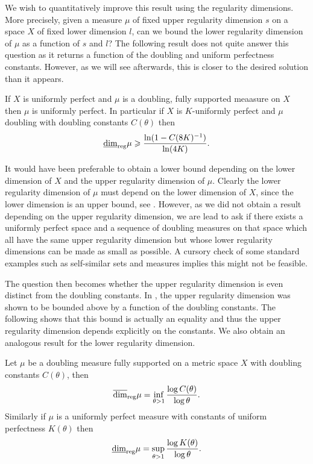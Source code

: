 We wish to quantitatively improve this result using the regularity dimensions. More precisely, given a measure $\mu$ of fixed upper regularity dimension $s$ on a space $X$ of fixed lower dimension $l$, can we bound the lower regularity dimension of $\mu$ as a function of $s$ and $l$? The following result does not quite answer this question as it returns a function of the doubling and uniform perfectness constants. However, as we will see afterwards, this is closer to the desired solution than it appears.

\begin{prop}
	If $X$ is uniformly perfect and $\mu$ is a doubling, fully supported meaasure on $X$ then $\mu$ is uniformly perfect. In particular if $X$ is $K$-uniformly perfect and $\mu$ doubling with doubling constants $C(\theta)$ then  
	$$\underline{\dim}_{\textup{reg}} \mu \geqslant \frac{\ln(1-C(8K)^{-1})}{\ln(4K)} .$$  
\end{prop}



It would have been preferable to obtain a lower bound depending on the lower dimension of $X$ and the upper regularity dimension of $\mu$. Clearly the lower regularity dimension of $\mu$ must depend on the lower dimension of $X$, since the lower dimension is an upper bound, see \cite{bylund}. However, as we did not obtain a result depending on the upper regularity dimension, we are lead to ask if there exists a uniformly perfect space and a sequence of doubling measures on that space which all have the same upper regularity dimension but whose lower regularity dimensions can be made as small as possible. A cursory check of some standard examples such as self-similar sets and measures implies this might not be feasible. 

The question then becomes whether the upper regularity dimension is even distinct from the doubling constants. In \cite{fraser-howroyd}, the upper regularity dimension was shown to be bounded  above by a function of the doubling constants. The following shows that this bound is actually an equality and thus the upper regularity dimension depends explicitly on the constants. We also obtain an analogous result for the lower regularity dimension.

\begin{thm}
	Let $\mu$ be a doubling measure fully supported on a metric space $X$ with doubling constants $C(\theta)$, then $$\overline{\dim}_{\textup{reg}} \mu = \inf_{\theta > 1}\frac{\log C(\theta)}{\log \theta}.$$ Similarly if $\mu$ is a uniformly perfect measure with constants of uniform perfectness $K(\theta)$ then $$\underline{\dim}_{\textup{reg}} \mu = \sup_{\theta > 1} \frac{\log K(\theta)}{\log \theta}.$$
\end{thm}


